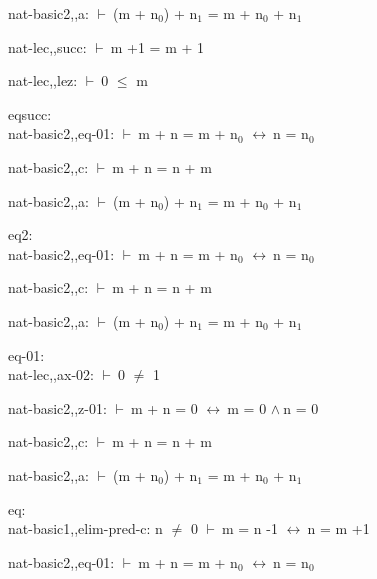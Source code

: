 \documentclass[a4paper]{article}
\newcommand{\Fol}{\mbox{$\vdash\ $}}
\newcommand{\And}{\mbox{$\wedge\ $}}
\newcommand{\Equiv}{\mbox{$\leftrightarrow\ $}}
\begin{document}
nat-basic2,,a: 
 \Fol (m + $\mbox{n}_{0}$) + $\mbox{n}_{1}$ = m + $\mbox{n}_{0}$ + $\mbox{n}_{1}$



nat-lec,,succ: 
 \Fol m +1 = m + 1



nat-lec,,lez: 
 \Fol 0 $\le$ m



\bigskip

eqsucc:\\ nat-basic2,,eq-01: 
 \Fol m + n = m + $\mbox{n}_{0}$ \Equiv n = $\mbox{n}_{0}$



nat-basic2,,c: 
 \Fol m + n = n + m



nat-basic2,,a: 
 \Fol (m + $\mbox{n}_{0}$) + $\mbox{n}_{1}$ = m + $\mbox{n}_{0}$ + $\mbox{n}_{1}$



\bigskip

eq2:\\ nat-basic2,,eq-01: 
 \Fol m + n = m + $\mbox{n}_{0}$ \Equiv n = $\mbox{n}_{0}$



nat-basic2,,c: 
 \Fol m + n = n + m



nat-basic2,,a: 
 \Fol (m + $\mbox{n}_{0}$) + $\mbox{n}_{1}$ = m + $\mbox{n}_{0}$ + $\mbox{n}_{1}$



\bigskip

eq-01:\\ nat-lec,,ax-02: 
 \Fol 0 $\neq$ 1



nat-basic2,,z-01: 
 \Fol m + n = 0 \Equiv m = 0 \And n = 0



nat-basic2,,c: 
 \Fol m + n = n + m



nat-basic2,,a: 
 \Fol (m + $\mbox{n}_{0}$) + $\mbox{n}_{1}$ = m + $\mbox{n}_{0}$ + $\mbox{n}_{1}$



\bigskip

eq:\\ nat-basic1,,elim-pred-c: 
n $\neq$ 0
 \Fol m = n -1 \Equiv n = m +1



nat-basic2,,eq-01: 
 \Fol m + n = m + $\mbox{n}_{0}$ \Equiv n = $\mbox{n}_{0}$
\end{document}
